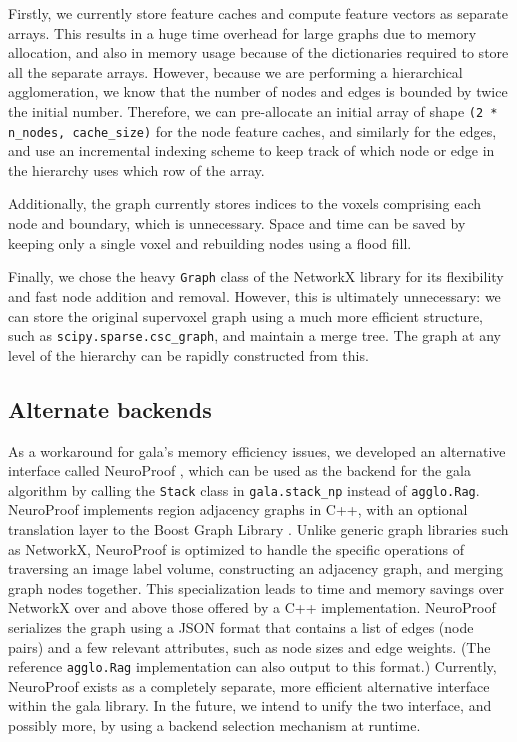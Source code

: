 \documentclass{frontiersSCNS} %
\begin{document}
Firstly, we currently store feature caches and compute feature vectors as separate arrays.
This results in a huge time overhead for large graphs due to memory allocation, and also in memory usage because of the dictionaries required to store all the separate arrays.
However, because we are performing a hierarchical agglomeration, we know that the number of nodes and edges is bounded by twice the initial number.
Therefore, we can pre-allocate an initial array of shape \texttt{\small (2 * n\_nodes, cache\_size)} for the node feature caches, and similarly for the edges, and use an incremental indexing scheme to keep track of which node or edge in the hierarchy uses which row of the array.

Additionally, the graph currently stores indices to the voxels comprising each node and boundary, which is unnecessary.
Space and time can be saved by keeping only a single voxel and rebuilding nodes using a flood fill.

Finally, we chose the heavy \texttt{\small Graph} class of the NetworkX library for its flexibility and fast node addition and removal.
However, this is ultimately unnecessary: we can store the original supervoxel graph using a much more efficient structure, such as \texttt{\small scipy.sparse.csc\_graph}, and maintain a merge tree.
The graph at any level of the hierarchy can be rapidly constructed from this.

\subsection{Alternate backends}
\label{section:np}

As a workaround for gala's memory efficiency issues, we developed an alternative interface called NeuroProof \citep{np}, which can be used as the backend for the gala algorithm by calling the \texttt{\small Stack} class in \texttt{\small gala.stack\_np} instead of \texttt{\small agglo.Rag}.
NeuroProof implements region adjacency graphs in C++, with an optional translation layer to the Boost Graph Library \citep{bgl}.
Unlike generic graph libraries such as NetworkX, NeuroProof is optimized to handle the specific operations of traversing an image label volume, constructing an adjacency graph, and merging graph nodes together.
This specialization leads to time and memory savings over NetworkX over and above those offered by a C++ implementation.
NeuroProof serializes the graph using a JSON format that contains a list of edges (node pairs) and a few relevant attributes, such as node sizes and edge weights.
(The reference \texttt{\small agglo.Rag} implementation can also output to this format.)
Currently, NeuroProof exists as a completely separate, more efficient alternative interface within the gala library.
In the future, we intend to unify the two interface, and possibly more, by using a backend selection mechanism at runtime.
\end{document}
